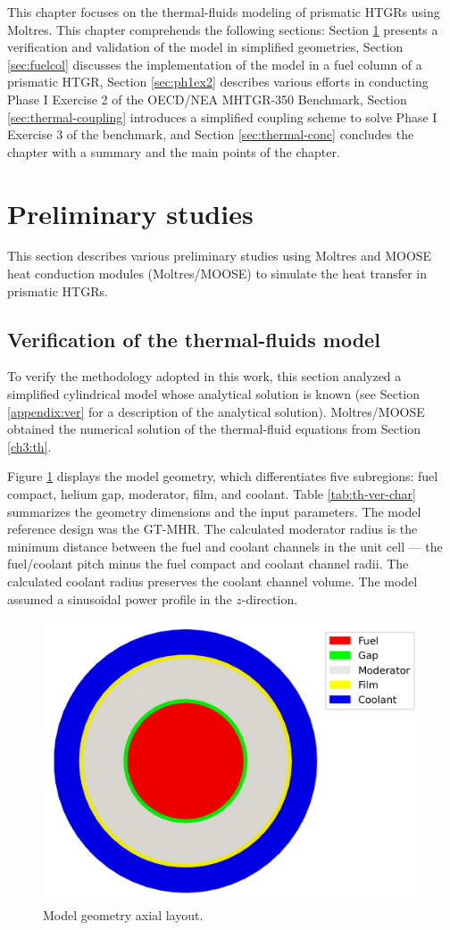 \label{ch:thermalfluids}

This chapter focuses on the thermal-fluids modeling of prismatic HTGRs using Moltres.
This chapter comprehends the following sections: 
Section \ref{sec:thermal-prelim} presents a verification and validation of the model in simplified geometries,
Section \ref{sec:fuelcol} discusses the implementation of the model in a fuel column of a prismatic HTGR,
Section \ref{sec:ph1ex2} describes various efforts in conducting Phase I Exercise 2 of the OECD/NEA MHTGR-350 Benchmark, 
Section \ref{sec:thermal-coupling} introduces a simplified coupling scheme to solve Phase I Exercise 3 of the benchmark,
and Section \ref{sec:thermal-conc} concludes the chapter with a summary and the main points of the chapter.

\section{Preliminary studies}
\label{sec:thermal-prelim}

This section describes various preliminary studies using Moltres and MOOSE heat conduction modules (Moltres/MOOSE) to simulate the heat transfer in prismatic HTGRs.

\subsection{Verification of the thermal-fluids model}
\label{sec:tf-ver}

To verify the methodology adopted in this work, this section analyzed a simplified cylindrical model whose analytical solution is known (see Section \ref{appendix:ver} for a description of the analytical solution).
Moltres/MOOSE obtained the numerical solution of the thermal-fluid equations from Section \ref{ch3:th}.

Figure \ref{fig:th-ver-mesh} displays the model geometry, which differentiates five subregions: fuel compact, helium gap, moderator, film, and coolant.
Table \ref{tab:th-ver-char} summarizes the geometry dimensions and the input parameters.
The model reference design was the GT-MHR.
The calculated moderator radius is the minimum distance between the fuel and coolant channels in the unit cell --- the fuel/coolant pitch minus the fuel compact and coolant channel radii.
The calculated coolant radius preserves the coolant channel volume.
The model assumed a sinusoidal power profile in the $z$-direction.

\begin{figure}[htbp!]
	\centering
	\includegraphics[width=0.40\linewidth]{figures-thermal/ver-mesh2}
	\hfill
	\caption{Model geometry axial layout.}
	\label{fig:th-ver-mesh}
\end{figure}


